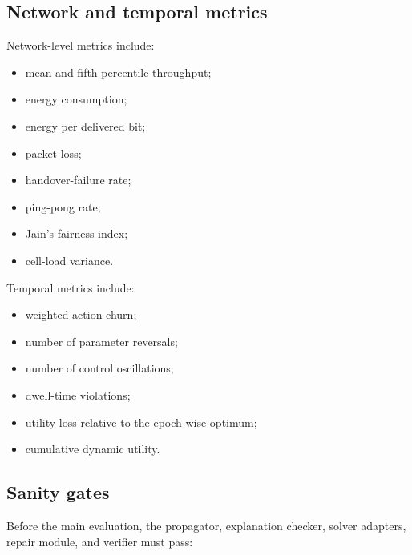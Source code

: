 \documentclass[pdflatex,sn-mathphys-num,iicol,oneside]{sn-jnl}
\begin{document}
\subsection{Network and temporal metrics}

Network-level metrics include:

\begin{itemize}
    \item mean and fifth-percentile throughput;
    \item energy consumption;
    \item energy per delivered bit;
    \item packet loss;
    \item handover-failure rate;
    \item ping-pong rate;
    \item Jain's fairness index;
    \item cell-load variance.
\end{itemize}

Temporal metrics include:

\begin{itemize}
    \item weighted action churn;
    \item number of parameter reversals;
    \item number of control oscillations;
    \item dwell-time violations;
    \item utility loss relative to the epoch-wise optimum;
    \item cumulative dynamic utility.
\end{itemize}

\subsection{Sanity gates}

Before the main evaluation, the propagator, explanation checker,
solver adapters, repair module, and verifier must pass:
\end{document}
